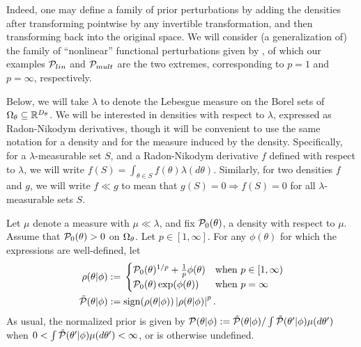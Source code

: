 Indeed, one may define a family of prior perturbations by adding the densities
after transforming pointwise by any invertible transformation, and then
transforming back into the original space.  We will consider (a generalization
of) the family of ``nonlinear'' functional perturbations given by
\citep{gustafson:1996:local}, of which our examples $\mathcal{P}_{lin}$ and $\mathcal{P}_{mult}$
are the two extremes, corresponding to $p=1$ and $p=\infty$, respectively.

Below, we will take $\lambda$ to denote the Lebesgue measure on the Borel sets
of $\Omega_{\theta} \subseteq \mathbb{R}^{{D_{\theta}}}$.  We will be interested in
densities with respect to $\lambda$, expressed as Radon-Nikodym derivatives,
though it will be convenient to use the same notation for a density and for the
measure induced by the density.  Specifically, for a $\lambda$-measurable set
$S$, and a Radon-Nikodym derivative $f$ defined with respect to $\lambda$, we
will write $f(S) = \int_{\theta \in S} f(\theta) \lambda(d\theta)$.  Similarly,
for two densities $f$ and $g$, we will write $f \ll g$ to mean that $g(S) = 0
\Rightarrow f(S) = 0$ for all $\lambda$-measurable sets $S$.

\begin{defn}
%
Let $\mu$ denote a measure with $\mu \ll \lambda$, and fix $\mathcal{P}_{0}(\theta)$, a
density with respect to $\mu$.  Assume that $\mathcal{P}_{0}(\theta) > 0$ on $\Omega_{\theta}$.
Let $p \in [1, \infty]$.  For any $\phi(\theta)$ for which the expressions are
well-defined, let
%
\begin{align*}
%
\rho(\theta \vert \phi) :={}& \begin{cases}
%
\pbase(\theta)^{1/p} + \frac{1}{p}\phi(\theta)
    & \textrm{when }p \in [1, \infty) \\
\pbase(\theta)\exp(\phi(\theta))
    & \textrm{when }p = \infty
%
\end{cases}\\
%
\tilde{\p}(\theta \vert \phi) :={}&
    \mathrm{sign}(\rho(\theta \vert \phi)) \abs{\rho(\theta \vert \phi)}^p.
%
\end{align*}
%
As usual, the normalized prior is given by
$\mathcal{P}(\theta \vert \phi) :=
    \tilde{\mathcal{P}}(\theta \vert \phi) /
         \int \tilde{\mathcal{P}}(\theta' \vert \phi) \mu(d\theta')$
when $0 < \int \tilde{\mathcal{P}}(\theta' \vert \phi) \mu(d\theta') < \infty$,
or is otherwise undefined.
%
\end{defn}
%

